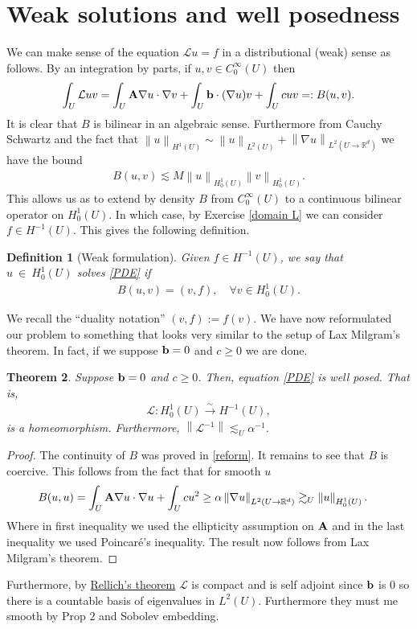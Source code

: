 \documentclass[
    a4paper,
    DIV=14,
    abstract=true,
    numbers=noenddot
]
{scrartcl}
\newtheorem{theorem}{Theorem}[section]
\newtheorem{definition}[theorem]{Definition}
\theoremstyle{definition}
\renewcommand{\norm}[1]{\left\lVert #1 \right\rVert}\renewcommand{\abs}[1]{\left| #1 \right|}
\newcommand{\iso}{\xrightarrow{\sim}}
\newcommand{\R}{\mathbb{R}}
\newcommand{\Ll}{\mathcal{L}}
\begin{document}
\section{Weak solutions and well posedness}
We can make sense of the equation $\Ll u =f$ in a distributional (weak) sense as follows.
By an integration by parts, if $u,v \in  C_0^\infty(U)$ then \begin{align*}
    \int_{U} \Ll u v =\int_{U}\vb{A} \nabla u \cdot \nabla v + \int_{U} \vb{b} \cdot ( \nabla  u) v + \int_{U} cuv=: B(u,v)   .
\end{align*}
It is clear that $B$ is bilinear in an algebraic sense. Furthermore from Cauchy Schwartz and  the fact that $\norm{u}_{H^1(U)}\sim \norm{u}_{L^2(U)}+\norm{\nabla u}_{L^2(U\to \R^d)}$ we have the bound
\begin{align}\label{cont B}
    B(u,v)\lesssim M \norm{u}_{H_0^1(U)}\norm{v}_{H_0^1(U)}.
\end{align}
This allows us as to extend by density $B$ from $C_0^\infty(U)$ to a continuous bilinear operator on  $H^1_0(U)$. In which case, by Exercise \ref{domain L} we can consider $f \in H^{-1}(U)$. This gives the following definition.
\begin{definition}[Weak formulation]
    Given $f \in  H^{-1}(U)$, we say that $u~\in~H_0^1(U)$ solves \eqref{PDE} if
    \begin{align}\label{reform}
        B(u,v)= (v,f) , \quad\forall v \in  H^{1}_0(U).
    \end{align}
\end{definition}
We recall the ``duality notation'' $(v,f):= f(v)$. We have now reformulated our problem to something that looks very similar to the setup of Lax Milgram's theorem. In fact, if we suppose $\vb{b}=0$ and $c \geq 0$ we are done.
\begin{theorem}\label{well posed 1}
    Suppose $\vb{b}=0$  and $c \geq 0$. Then, equation \eqref{PDE} is well posed. That is,
    \begin{align*}
        \Ll : H_0^1(U) \iso  H^{-1}(U),
    \end{align*}
    is a homeomorphism. Furthermore, $\norm{\Ll^{-1}} \lesssim_U \alpha ^{-1}$.
\end{theorem}
\begin{proof}
    The continuity of $B$ was proved in  \eqref{reform}. It remains to see that $B$ is coercive. This follows from the fact that for smooth $u$
    \begin{align}\label{b=0}
        B(u,u) & = \int_{U}\vb{A} \nabla u \cdot \nabla u + \int_{U} cu^2 \geq \alpha \norm{\nabla u}_{L^2(U \to \R^d)} \gtrsim_U \norm{u}_{H^1_0(U)}.
    \end{align}
    Where in first inequality we used the ellipticity assumption on $\vb{A}$ and in the last inequality we used Poincaré's inequality. The result now follows from Lax Milgram's theorem.
\end{proof}
Furthermore, by \href{https://nowheredifferentiable.com/2023-07-12-PDEs-3-Sobolev_spaces/#:~:text=Theorem%2014%20(-,Rellich,-for%20trace%200}{Rellich's theorem} $\Ll$ is compact and is self adjoint since $\vb{b}$ is  $0$ so there is a countable basis of eigenvalues in  $L^2(U)$. Furthermore they must me smooth by Prop  $2$ and Sobolev embedding.
\end{document}
